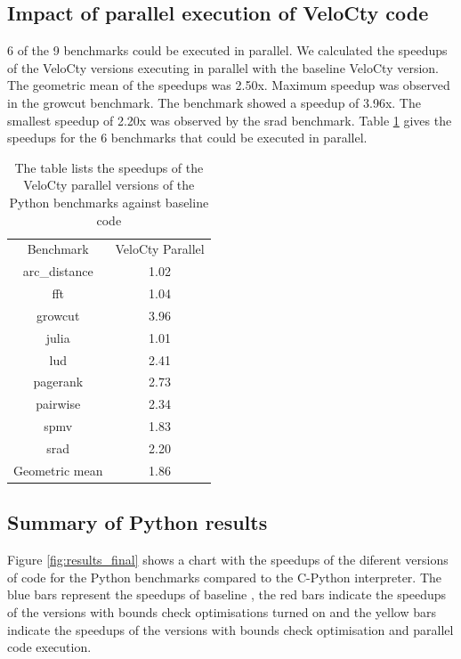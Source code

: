 \subsection{Impact of parallel execution of VeloCty code}
6 of the 9 benchmarks could be executed in parallel. We calculated the speedups of the VeloCty versions executing in parallel with the baseline VeloCty version. The geometric mean of the speedups was 2.50x. Maximum speedup was observed in the growcut benchmark. The benchmark showed a speedup of 3.96x. The smallest speedup of 2.20x  was observed by the srad benchmark. Table \ref{tab:cpvscwopy} gives the speedups for the 6 benchmarks that could be executed in parallel.
\begin{table}[h]
\centering
\begin{tabular}{|c|c|}
\hline
Benchmark      & VeloCty Parallel \\ \hhline{|=|=|}
arc\_distance  & 1.02             \\ \hline
fft            & 1.04             \\ \hline
growcut        & 3.96             \\ \hline
julia          & 1.01             \\ \hline
lud            & 2.41             \\ \hline
pagerank       & 2.73             \\ \hline
pairwise       & 2.34             \\ \hline
spmv           & 1.83             \\ \hline
srad           & 2.20             \\ \hline
Geometric mean & 1.86             \\ \hline
\end{tabular}
\caption[Speedup of VeloCty parallel for Python]{The table lists the speedups of the VeloCty parallel versions of the Python benchmarks against baseline \velocty code}
\label{tab:cpvscwopy}
\end{table}

\subsection{Summary of Python results}
Figure \ref{fig:results_final} shows a chart with the speedups of the diferent versions of \velocty code for the Python benchmarks compared to the C-Python interpreter. The blue bars represent the speedups of baseline \velocty, the red bars indicate the speedups of the \velocty versions with bounds check optimisations turned on and the yellow bars indicate the speedups of the \velocty versions with bounds check optimisation and parallel code execution. 

